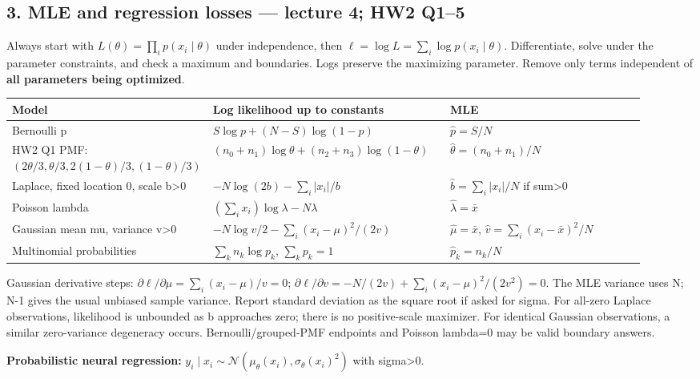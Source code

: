 \documentclass[11pt]{article}
\begin{document}
\subsection*{3. MLE and regression losses — lecture 4; HW2 Q1–5}

Always start with $L(\theta)=\prod_i p(x_i\mid\theta)$ under independence, then $\ell=\log L=\sum_i\log p(x_i\mid\theta)$. Differentiate, solve under the parameter constraints, and check a maximum and boundaries. Logs preserve the maximizing parameter. Remove only terms independent of \textbf{all parameters being optimized}.

{\small\setlength{\tabcolsep}{3pt}\renewcommand{\arraystretch}{1.25}
\begin{longtable}{>{\raggedright\arraybackslash}p{0.19\linewidth}>{\raggedright\arraybackslash}p{0.38\linewidth}>{\raggedright\arraybackslash}p{0.35\linewidth}}
\toprule
Model & Log likelihood up to constants & MLE \\
\midrule\endhead
Bernoulli p & $S\log p+(N-S)\log(1-p)$ & $\hat p=S/N$ \\
HW2 Q1 PMF: $(2\theta/3,\theta/3,2(1-\theta)/3,(1-\theta)/3)$ & $(n_0+n_1)\log\theta+(n_2+n_3)\log(1-\theta)$ & $\hat\theta=(n_0+n_1)/N$ \\
Laplace, fixed location 0, scale b>0 & $-N\log(2b)-\sum_i|x_i|/b$ & $\hat b=\sum_i|x_i|/N$ if sum>0 \\
Poisson lambda & $(\sum_i x_i)\log\lambda-N\lambda$ & $\hat\lambda=\bar x$ \\
Gaussian mean mu, variance v>0 & $-N\log v/2-\sum_i(x_i-\mu)^2/(2v)$ & $\hat\mu=\bar x$, $\hat v=\sum_i(x_i-\bar x)^2/N$ \\
Multinomial probabilities & $\sum_k n_k\log p_k$, $\sum_kp_k=1$ & $\hat p_k=n_k/N$ \\
\bottomrule\end{longtable}}

Gaussian derivative steps: $\partial\ell/\partial\mu=\sum_i(x_i-\mu)/v=0$; $\partial\ell/\partial v=-N/(2v)+\sum_i(x_i-\mu)^2/(2v^2)=0$. The MLE variance uses N; N-1 gives the usual unbiased sample variance. Report standard deviation as the square root if asked for sigma. For all-zero Laplace observations, likelihood is unbounded as b approaches zero; there is no positive-scale maximizer. For identical Gaussian observations, a similar zero-variance degeneracy occurs. Bernoulli/\allowbreak{}grouped-PMF endpoints and Poisson lambda=0 may be valid boundary answers.

\textbf{Probabilistic neural regression:} $y_i\mid x_i\sim\mathcal N(\mu_\theta(x_i),\sigma_\theta(x_i)^2)$ with sigma>0.
\end{document}
